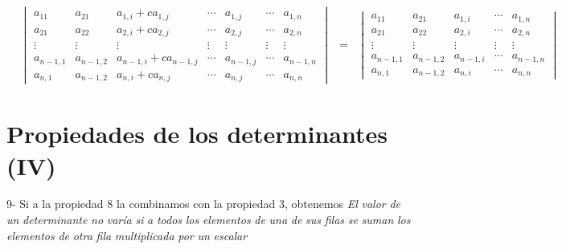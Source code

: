 \documentclass[
]{article}
\begin{document}
\begin{equation}
\begin{array}{cccc}
 &  \begin{vmatrix} 
     a_{11}     & a_{21}      & a_{1,i}  + ca_{1,j}     & \cdots  &  a_{1,j}    & \cdots  & a_{1,n}      \\ 
     a_{21}     & a_{22}      & a_{2,i}  + ca_{2,j}     & \cdots  &  a_{2,j}    & \cdots  & a_{2,n}      \\
    \vdots      & \vdots      &  \vdots                  & \vdots  &  \vdots    & \vdots  &  \vdots      \\
     a_{n-1,1}  & a_{n-1,2}   & a_{n-1,i}+ ca_{n-1,j}    & \cdots  &  a_{n-1,j} & \cdots  & a_{n-1,n}      \\
     a_{n,1}    &  a_{n-1,2}  & a_{n,i}  + ca_{n,j}      & \cdots  &  a_{n,j}   & \cdots  & a_{n,n}
  \end{vmatrix} & = &
  \begin{vmatrix} 
     a_{11}     & a_{21}      & a_{1,i}      & \cdots     & a_{1,n}      \\ 
     a_{21}     & a_{22}      & a_{2,i}      & \cdots     & a_{2,n}      \\
    \vdots      & \vdots      &  \vdots       & \vdots     & \vdots \\
     a_{n-1,1}  & a_{n-1,2}   & a_{n-1,i}    & \cdots     & a_{n-1,n}      \\
     a_{n,1}    &  a_{n-1,2}  & a_{n,i}      & \cdots     & a_{n,n}
  \end{vmatrix} 
\end{array}
\end{equation}

\hypertarget{propiedades-de-los-determinantes-iv}{%
\section{Propiedades de los determinantes
(IV)}\label{propiedades-de-los-determinantes-iv}}

\small

9- Si a la propiedad 8 la combinamos con la propiedad 3, obtenemos
\emph{El} \emph{valor} \emph{de} \emph{un} \emph{determinante} \emph{no}
\emph{varía} \emph{si} \emph{a} \emph{todos} \emph{los} \emph{elementos}
\emph{de} \emph{una} \emph{de} \emph{sus} \emph{filas} \emph{se}
\emph{suman} \emph{los} \emph{elementos} \emph{de} \emph{otra}
\emph{fila} \emph{multiplicada} \emph{por} \emph{un} \emph{escalar}
\end{document}
